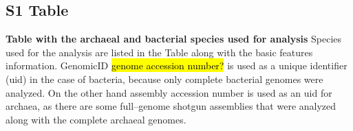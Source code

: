 \documentclass[10pt,letterpaper]{article}
\begin{document}

\subsection*{S1 Table}
\label{table:s1}
{\bf Table with the archaeal and bacterial species used for analysis}
Species used for the analysis are listed in the Table along with the basic features information.
GenomicID \hl{genome accession number?} is used as a unique identifier (uid) in the case of bacteria, because only complete bacterial genomes were analyzed. On the other hand assembly accession number is used as an uid for archaea, as there are some full--genome shotgun assemblies that were analyzed along with the complete archaeal genomes.


\end{document}
